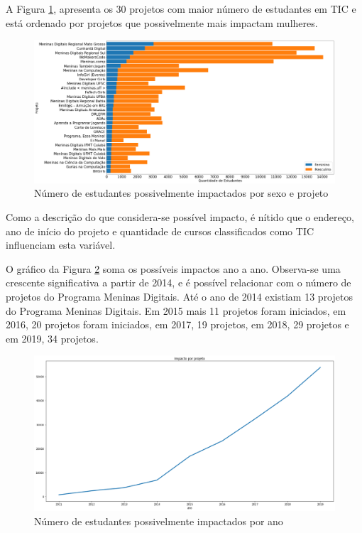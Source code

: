 A Figura \ref{fig:impactoProjetoTotal}, apresenta os 30 projetos com maior número de estudantes em TIC e está ordenado por projetos que possivelmente mais impactam mulheres. 

\begin{figure}[H]
\centering
\includegraphics[width=1\textwidth]{Figuras/impacto_projetotrinta.png}
\caption{Número de estudantes possivelmente impactados por sexo e projeto}
\label{fig:impactoProjetoTotal}
\end{figure}

Como a descrição do que considera-se possível impacto, é nítido que o endereço, ano de início do projeto e quantidade de cursos classificados como TIC influenciam esta variável.

O gráfico da Figura \ref{fig:impactoAnoTotal} soma os possíveis impactos ano a ano. Observa-se uma crescente significativa a partir de 2014, e é possível relacionar com o número de projetos do Programa Meninas Digitais. Até o ano de 2014 existiam 13 projetos do Programa Meninas Digitais. Em 2015 mais 11 projetos foram iniciados, em 2016, 20 projetos foram iniciados, em 2017, 19 projetos, em 2018, 29 projetos e em 2019, 34 projetos. 


\begin{figure}[H]
\centering
\includegraphics[width=1\textwidth]{Figuras/impactoanoTotal.png}
\caption{Número de estudantes possivelmente impactados por ano}
\label{fig:impactoAnoTotal}
\end{figure}




